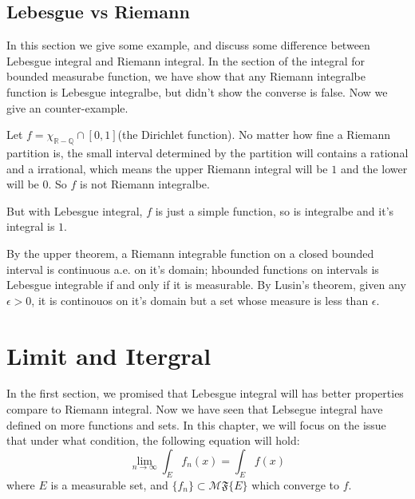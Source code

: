 \documentclass[lang=en, 12pt]{elegantbook}
\newcommand{\RR}{\mathbb{R}}
\newcommand{\QQ}{\mathbb{Q}}
\newcommand{\lmf}[1]{$\mathcal{M} \mathfrak{F} \{#1\}$}
\begin{document}
    \section{Lebesgue vs Riemann}
        In this section we give some example, and discuss some difference between Lebesgue integral and Riemann integral. In the section of 
    the integral for bounded measurabe function, we have show that any Riemann integralbe function is Lebesgue integralbe, but didn't show 
    the converse is false. Now we give an counter-example.
        \begin{example}
            Let $f = \chi_{\RR -\QQ} \cap [0,1]$(the Dirichlet function). No matter how fine a Riemann partition is, the small interval
        determined by the partition will contains a rational and a irrational, which means the upper Riemann integral will be $1$ and 
        the lower will be $0$. So $f$ is not Riemann integralbe. \par
            But with Lebesgue integral, $f$ is just a simple function, so is integralbe and it's integral is $1$.
        \end{example}

        \begin{theorem}
            
        \end{theorem}
        By the upper theorem, a Riemann integrable function on a closed bounded interval is continuous a.e. on it's domain; hbounded 
    functions on intervals is Lebesgue integrable if and only if it is measurable. By Lusin's theorem, given any $\epsilon>0$, it is 
    continouos on it's domain but a set whose measure is less than $\epsilon$. 

\chapter{Limit and Itergral}
        In the first section, we promised that Lebesgue integral will has better properties compare to Riemann integral. Now we have 
    seen that Lebsegue integral have defined on more functions and sets. In this chapter, we will focus on the issue 
    that under what condition, the following equation will hold: 
    \begin{equation*}
        \lim_{n \to \infty} \int_E f_n(x) = \int_E f(x) 
    \end{equation*}
    where $E$ is a measurable set, and $\{f_n\} \subset $\lmf{E} which converge to $f$.  
        
\end{document}
